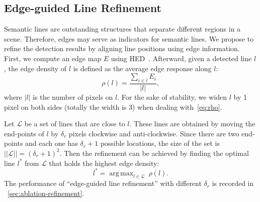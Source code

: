 \documentclass[10pt,journal,cspaper,compsoc]{IEEEtran}
\DeclareMathOperator*{\argmax}{arg\,max} %
\begin{document}
\subsection{Edge-guided Line Refinement}\label{sec:refine} 
Semantic lines are outstanding structures that
separate different regions in a scene.
%
Therefore, edges may serve as indicators for semantic lines.
%
We propose to refine the detection results by aligning line positions using
edge information.
% 
First, we compute an edge map $E$ using HED~\cite{xie2015holistically}.
%
Afterward, given a detected line $l$, the edge density of $l$ is defined as the average
edge response along $l$:
\begin{equation}
\rho(l) = \frac{\sum_{i\in l} E_i}{|l|},
\label{eq:rho}
\end{equation}
where $|l|$ is the number of pixels on $l$.
%
For the sake of stability, we widen $l$ by 1 pixel on both sides (totally the width is 3)
when dealing with~\cref{eq:rho}.

Let $\mathcal{L}$ be a set of lines that are close to $l$.
%
These lines are obtained by moving the end-points of $l$ by $\delta_r$ pixels clockwise
and anti-clockwise.
%
Since there are two end-points and each one has
$\delta_r+1$ possible locations, the size of the set is $||\mathcal{L}|| = (\delta_r+1)^2$.
%
Then the refinement can be achieved by finding the optimal line $l^*$ from $\mathcal{L}$
that holds the highest edge density:
\begin{equation}
  l^* = \argmax_{l\in\mathcal{L}} \ \rho(l).\label{eq:refine-search}
\end{equation}
The performance of ``edge-guided line refinement'' with different $\delta_r$
is recorded in ~\cref{sec:ablation-refinement}.


\end{document}
